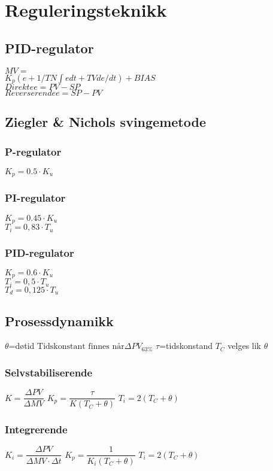 \section{Reguleringsteknikk}
\vskip 2.5pt 
\subsection*{PID-regulator}
$MV=$\\
$K_p(e+1/TN \int e dt + TV de/dt)+BIAS$\\
\vskip 2.5pt
$Direkte e=PV-SP$\\
$Reverserende e=SP-PV$\\
\subsection*{Ziegler \& Nichols svingemetode}
\subsubsection*{P-regulator}
$K_p = 0.5\cdot K_u$
\subsubsection*{PI-regulator}
$K_p = 0.45\cdot K_u$\\
$T_i = 0,83\cdot T_u$\\
\subsubsection*{PID-regulator}
$K_p = 0.6\cdot K_u$\\
$T_i = 0,5\cdot T_u$\\
$T_d = 0,125\cdot T_u$\\
\vskip 2.5pt 
\subsection*{Prosessdynamikk}
\vskip 2.5pt 
$\theta$=døtid
\vskip 2.5pt 
$ \text{Tidskonstant finnes når} \Delta PV_{63\%}$
\vskip 2.5pt 
$\tau$=tidskonstand
\vskip 2.5pt 
$T_C$ velges lik $\theta$
\vskip 2.5pt 
\subsubsection*{Selvstabiliserende}
\vskip 2.5pt 
$K=\dfrac{\Delta PV}{\Delta MV} $
\vskip 2.5pt 
$K_p=\dfrac{\tau}{K(T_C+\theta)}$
\vskip 2.5pt 
$T_i=2(T_C+\theta)$
\vskip 2.5pt 
\subsubsection*{Integrerende}
\vskip 2.5pt 
$K_i=\dfrac{\Delta PV}{\Delta MV \cdot {\Delta t}}$
\vskip 2.5pt 
$K_p=\dfrac{1}{K_i(T_C+\theta)}$
\vskip 2.5pt 
$T_i=2(T_C+\theta)$\\

